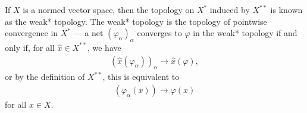 If $X$ is a normed vector space, then the topology on $X^{\ast}$ induced by $X^{\ast\ast}$ is known as the weak* topology. The weak* topology is the topology of pointwise convergence in $X^{\ast}$ --- a net $\left(\varphi_{\alpha}\right)_{\alpha}$ converges to $\varphi$ in the weak* topology if and only if, for all $\hat{x}\in X^{\ast\ast}$, we have
\begin{align*}
  \left(\hat{x}\left(\varphi_{\alpha}\right)\right)_{\alpha}\rightarrow \hat{x}\left(\varphi\right),
\end{align*}
or by the definition of $X^{\ast\ast}$, this is equivalent to
\begin{align*}
  \left(\varphi_{\alpha}\left(x\right)\right) \rightarrow \varphi\left(x\right)
\end{align*}
for all $x\in X$.\newline

